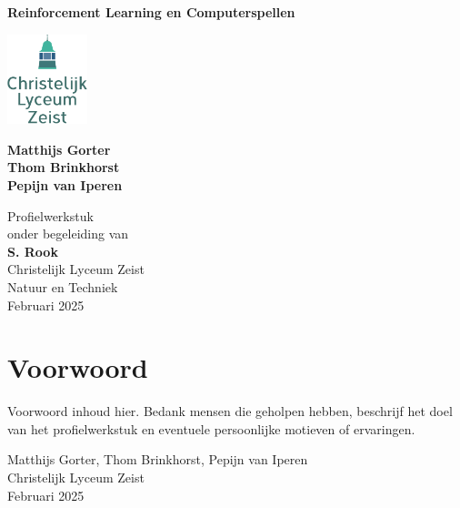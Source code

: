 \documentclass[a4paper,12pt]{article}
\begin{document}
\begin{titlepage}

    \centering
    \vspace*{2cm}

    \Huge
    \textbf{Reinforcement Learning en Computerspellen}

    \vspace{1.5cm}

    \includegraphics[width=0.175\textwidth]{logo-clz.png} %

    \vspace{1.5cm}

    \large
    \textbf{Matthijs Gorter} \\
    \textbf{Thom Brinkhorst} \\
    \textbf{Pepijn van Iperen} \\

    \vspace{1.5cm}

    \large
    Profielwerkstuk \\
    onder begeleiding van \\
    \textbf{S. Rook} \\
    Christelijk Lyceum Zeist \\
    Natuur en Techniek \\
    Februari 2025 \\

    \vfill

\end{titlepage}
\newpage
\section*{Voorwoord}
Voorwoord inhoud hier. Bedank mensen die geholpen hebben, beschrijf het doel van het profielwerkstuk en eventuele persoonlijke motieven of ervaringen.

\vspace{1cm}
\noindent
Matthijs Gorter, Thom Brinkhorst, Pepijn van Iperen \\
Christelijk Lyceum Zeist \\
Februari 2025
\end{document}

